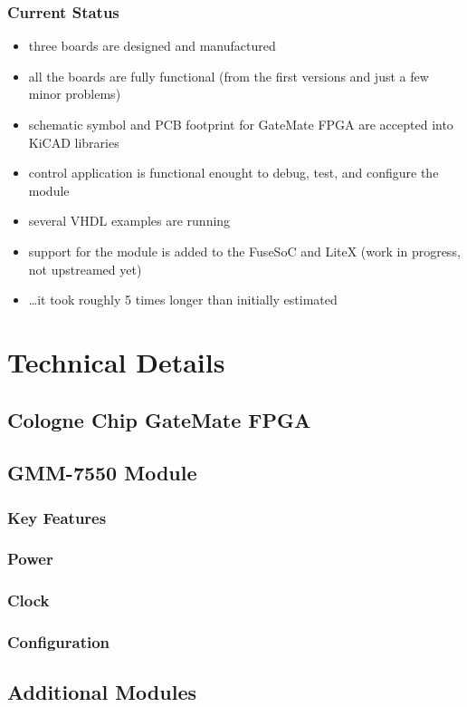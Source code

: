 \begin{frame}
  \frametitle{Current Status}
  \begin{itemize}
    \item three boards are designed and manufactured
    \item all the boards are fully functional (from the first versions and
    just a few minor problems)
    \item schematic symbol and PCB footprint for GateMate FPGA are accepted
    into KiCAD libraries
    \item control application is functional enought to debug, test,
    and configure the module
    \item several VHDL examples are running
    \item support for the module is added to the FuseSoC and LiteX
    (work in progress, not upstreamed yet)
    \item \dots it took roughly 5 times longer than initially estimated
  \end{itemize}
\end{frame}

\section{Technical Details}

\subsection{Cologne Chip GateMate FPGA}

\subsection{GMM-7550 Module}

\begin{frame}
  \frametitle{Key Features}
\end{frame}

\begin{frame}
  \frametitle{Power}
\end{frame}

\begin{frame}
  \frametitle{Clock}
\end{frame}

\begin{frame}
  \frametitle{Configuration}
\end{frame}

\subsection{Additional Modules}

